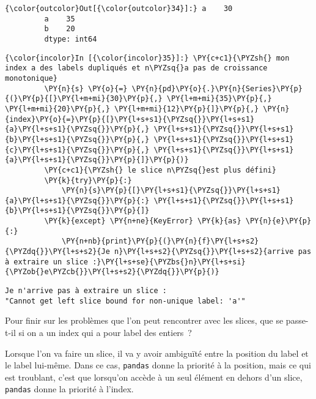 \begin{Verbatim}[commandchars=\\\{\},frame=single,framerule=0.3mm,rulecolor=\color{cellframecolor}]
{\color{outcolor}Out[{\color{outcolor}34}]:} a    30
         a    35
         b    20
         dtype: int64
\end{Verbatim}
            
    \begin{Verbatim}[commandchars=\\\{\},frame=single,framerule=0.3mm,rulecolor=\color{cellframecolor}]
{\color{incolor}In [{\color{incolor}35}]:} \PY{c+c1}{\PYZsh{} mon index a des labels dupliqués et n\PYZsq{}a pas de croissance monotonique}
         \PY{n}{s} \PY{o}{=} \PY{n}{pd}\PY{o}{.}\PY{n}{Series}\PY{p}{(}\PY{p}{[}\PY{l+m+mi}{30}\PY{p}{,} \PY{l+m+mi}{35}\PY{p}{,} \PY{l+m+mi}{20}\PY{p}{,} \PY{l+m+mi}{12}\PY{p}{]}\PY{p}{,} \PY{n}{index}\PY{o}{=}\PY{p}{[}\PY{l+s+s1}{\PYZsq{}}\PY{l+s+s1}{a}\PY{l+s+s1}{\PYZsq{}}\PY{p}{,} \PY{l+s+s1}{\PYZsq{}}\PY{l+s+s1}{b}\PY{l+s+s1}{\PYZsq{}}\PY{p}{,} \PY{l+s+s1}{\PYZsq{}}\PY{l+s+s1}{c}\PY{l+s+s1}{\PYZsq{}}\PY{p}{,} \PY{l+s+s1}{\PYZsq{}}\PY{l+s+s1}{a}\PY{l+s+s1}{\PYZsq{}}\PY{p}{]}\PY{p}{)}
         \PY{c+c1}{\PYZsh{} le slice n\PYZsq{}est plus défini}
         \PY{k}{try}\PY{p}{:}
             \PY{n}{s}\PY{p}{[}\PY{l+s+s1}{\PYZsq{}}\PY{l+s+s1}{a}\PY{l+s+s1}{\PYZsq{}}\PY{p}{:} \PY{l+s+s1}{\PYZsq{}}\PY{l+s+s1}{b}\PY{l+s+s1}{\PYZsq{}}\PY{p}{]}
         \PY{k}{except} \PY{n+ne}{KeyError} \PY{k}{as} \PY{n}{e}\PY{p}{:}
             \PY{n+nb}{print}\PY{p}{(}\PY{n}{f}\PY{l+s+s2}{\PYZdq{}}\PY{l+s+s2}{Je n}\PY{l+s+s2}{\PYZsq{}}\PY{l+s+s2}{arrive pas à extraire un slice :}\PY{l+s+se}{\PYZbs{}n}\PY{l+s+si}{\PYZob{}e\PYZcb{}}\PY{l+s+s2}{\PYZdq{}}\PY{p}{)}
\end{Verbatim}


    \begin{Verbatim}[commandchars=\\\{\},frame=single,framerule=0.3mm,rulecolor=\color{cellframecolor}]
Je n'arrive pas à extraire un slice :
"Cannot get left slice bound for non-unique label: 'a'"
\end{Verbatim}

    Pour finir sur les problèmes que l'on peut rencontrer avec les slices,
que se passe-t-il si on a un index qui a pour label des entiers~?

Lorsque l'on va faire un slice, il va y avoir ambiguïté entre la
position du label et le label lui-même. Dans ce cas, \texttt{pandas}
donne la priorité à la position, mais ce qui est troublant, c'est que
lorsqu'on accède à un seul élément en dehors d'un slice, \texttt{pandas}
donne la priorité à l'index.

